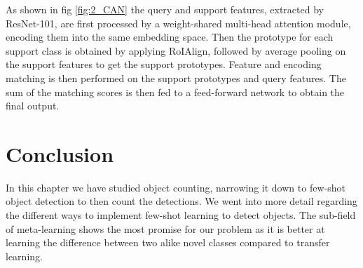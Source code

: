 As shown in fig \ref{fig:2_CAN} the query and support features, extracted by ResNet-101, are first processed by a weight-shared multi-head attention module, encoding them into the same embedding space. Then the prototype for each support class is obtained by applying RoIAlign, followed by average pooling on the support features to get the support prototypes. Feature and encoding matching is then performed on the support prototypes and query features. The sum of the matching scores is then fed to a feed-forward network to obtain the final output.

\section{Conclusion}
In this chapter we have studied object counting, narrowing it down to few-shot object detection to then count the detections. We went into more detail regarding the different ways to implement few-shot learning to detect objects. The sub-field of meta-learning shows the most promise for our problem as it is better at learning the difference between two alike novel classes compared to transfer learning.